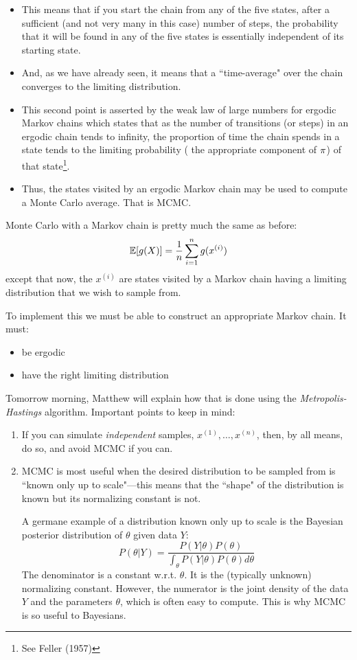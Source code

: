 \begin{itemize}
\item This means that if you start the chain from any of the five states, after a sufficient (and not very many in this case) number of steps, the probability that it will be found in any of the five states is essentially independent of its starting state.   

\item And, as we have already seen, it means that a ``time-average" over the chain converges to the limiting distribution. 

\item This second point is asserted by the weak law of large numbers for ergodic Markov chains which states that as the number of transitions (or steps) in an ergodic chain tends to infinity, the proportion of time the chain spends in a state tends to the limiting probability (\ie{} the appropriate component of ${\pi}$) of that state\footnote{See Feller (1957)}.  

\item Thus, the states visited by an ergodic Markov chain may be used to compute a Monte Carlo average.  That is MCMC.
\end{itemize}

Monte Carlo with a Markov chain is pretty much the same as before:
\[
	\Bbb{E}[g(X)] = \frac{1}{n}\sum_{i=1}^n g(x^{(i)})
\]
except that now, the $x^{(i)}$ are states visited by a Markov chain having a limiting distribution that we wish to sample from. 

To implement this we must be able to construct an appropriate Markov chain. It must:
\begin{itemize}
\item be ergodic
\item have the right limiting distribution
\end{itemize} 
Tomorrow morning, Matthew will explain how that is done using the
{\em Metropolis-Hastings} algorithm.  
\newpage
Important points to keep in mind:
\begin{enumerate}
\item If you can simulate {\em independent} samples, $x^{(1)},\ldots,x^{(n)}$, then, by all means, do so, and avoid MCMC if you can.
\item MCMC is most useful when the desired distribution to be sampled from is ``known only up to scale"---this means that the ``shape" of the distribution is known but its normalizing constant is not. 

A germane example of a distribution known only up to scale is the Bayesian posterior distribution of $\theta$ given data $Y$:
\[
	P(\theta|Y) = \frac{P(Y|\theta)P(\theta)}
		{\int_\theta P(Y|\theta)P(\theta)d\theta}
\] 
The denominator is a constant w.r.t. $\theta$.  It is the (typically unknown) normalizing constant.  However, the numerator is the joint density of the data $Y$ and the parameters $\theta$, which is often easy to compute. This is why MCMC is so useful to Bayesians.
\end{enumerate}

